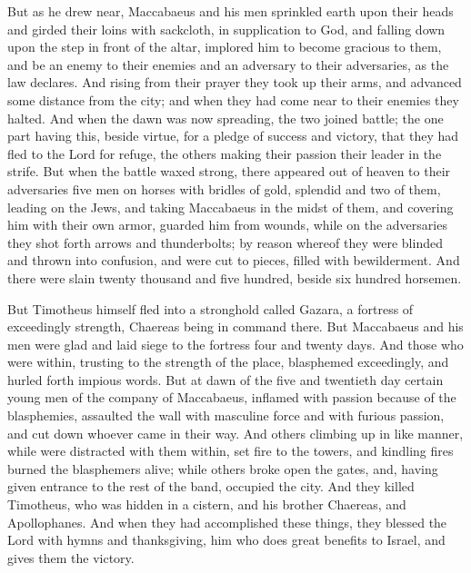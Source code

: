 {But as he drew near, Maccabaeus and his men sprinkled earth upon their heads and girded their loins with sackcloth, in supplication to God,
and falling down upon the step in front of the altar, implored him to become
 gracious to them, and
 be an enemy to their enemies and an adversary to their adversaries, as the law declares.
And rising from their prayer they took up their arms, and advanced some distance from the city; and when they had come near to their enemies they
 halted.
And when the dawn was now spreading, the two
{} joined battle; the one part having this, beside
{} virtue, for a pledge of success and victory, that they had fled to the Lord for refuge, the others making their passion their leader in the strife.
But when the battle waxed strong, there appeared out of heaven to their adversaries five men on horses with bridles of gold,
{} splendid
{}
 and two of them, leading on the Jews,
and taking Maccabaeus in the midst of them, and covering him with their own armor, guarded him from wounds, while on the adversaries they shot forth arrows and thunderbolts; by reason whereof they were blinded and thrown into confusion, and were cut to pieces, filled with bewilderment.
And there were slain twenty thousand and five hundred, beside six hundred horsemen.
\par }{\PP {}But Timotheus himself fled into a stronghold called Gazara, a fortress of exceedingly strength,
 Chaereas being in command there.
But Maccabaeus and his men were glad and laid siege to the fortress four and twenty days.
And those who were within, trusting to the strength of the place, blasphemed exceedingly, and hurled forth impious words.
But at dawn of the five and twentieth day certain young men of the company of Maccabaeus, inflamed with passion because of the blasphemies, assaulted the wall with masculine force and with
 furious passion, and cut down whoever came in their way.
And others climbing up in like manner, while
{} were distracted with them
{} within, set fire to the towers, and kindling fires burned the blasphemers alive; while others broke open the gates, and, having given entrance to the rest of the band, occupied the city.
And they killed Timotheus, who was hidden in a cistern, and his brother Chaereas, and Apollophanes.
And when they had accomplished these things, they blessed the Lord with hymns and thanksgiving, him who does great benefits to Israel, and gives them the victory.

}
